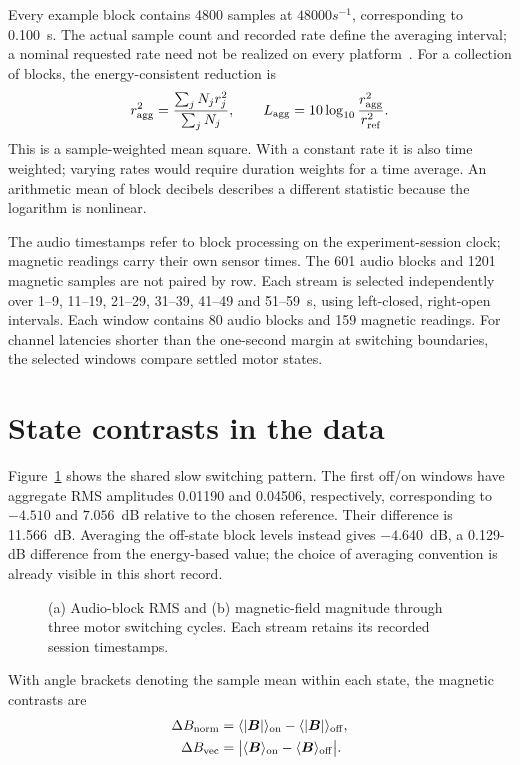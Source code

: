 Every example block contains 4800 samples at $48000\unit{s^{-1}}$, corresponding to 0.100~s. The actual sample count and recorded rate define the averaging interval; a nominal requested rate need not be realized on every platform~\cite{phyphoxinputs2026}. For a collection of blocks, the energy-consistent reduction is
\begin{equation}
 r_{\rm agg}^2=\frac{\sum_j N_j r_j^2}{\sum_j N_j},
 \qquad L_{\rm agg}=10\log_{10}\frac{r_{\rm agg}^2}{r_{\rm ref}^2}.
 \label{eq:audio-magnetic-aggregate}
\end{equation}
This is a sample-weighted mean square. With a constant rate it is also time weighted; varying rates would require duration weights for a time average. An arithmetic mean of block decibels describes a different statistic because the logarithm is nonlinear.

The audio timestamps refer to block processing on the experiment-session clock; magnetic readings carry their own sensor times. The 601 audio blocks and 1201 magnetic samples are not paired by row. Each stream is selected independently over 1--9, 11--19, 21--29, 31--39, 41--49 and 51--59~s, using left-closed, right-open intervals. Each window contains 80 audio blocks and 159 magnetic readings. For channel latencies shorter than the one-second margin at switching boundaries, the selected windows compare settled motor states.

\section{State contrasts in the data}
Figure~\ref{fig:audio-magnetic-example} shows the shared slow switching pattern. The first off/on windows have aggregate RMS amplitudes 0.01190 and 0.04506, respectively, corresponding to $-4.510$ and $7.056$~dB relative to the chosen reference. Their difference is 11.566~dB. Averaging the off-state block levels instead gives $-4.640$~dB, a 0.129-dB difference from the energy-based value; the choice of averaging convention is already visible in this short record.

\begin{figure}[t]
\centering

\caption{(a) Audio-block RMS and (b) magnetic-field magnitude through three motor switching cycles. Each stream retains its recorded session timestamps.}
\label{fig:audio-magnetic-example}
\end{figure}

With angle brackets denoting the sample mean within each state, the magnetic contrasts are
\begin{equation}
 \begin{aligned}
 \Delta B_{\rm norm}&=\langle|\bm B|\rangle_{\rm on}-\langle|\bm B|\rangle_{\rm off},\\
 \Delta B_{\rm vec}&=\big|\langle\bm B\rangle_{\rm on}-\langle\bm B\rangle_{\rm off}\big|.
 \end{aligned}
 \label{eq:audio-magnetic-vector}
\end{equation}

